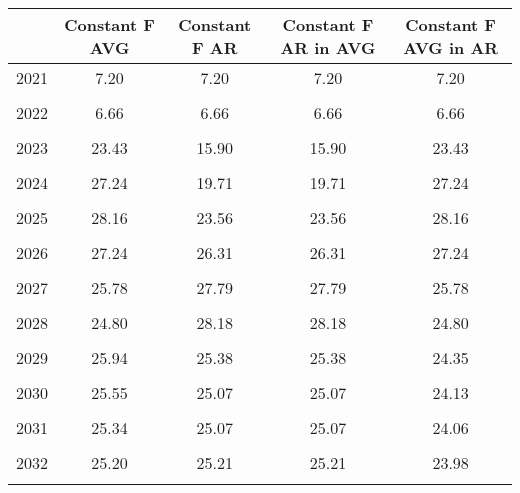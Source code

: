 \begin{tabular}{l*{4}{c}}
\hline\hline
                &Constant F AVG&Constant F AR&Constant F AR in AVG&Constant F AVG in AR\\
\hline
2021            &     7.20&     7.20&     7.20&     7.20\\
                &         &         &         &         \\
2022            &     6.66&     6.66&     6.66&     6.66\\
                &         &         &         &         \\
2023            &    23.43&    15.90&    15.90&    23.43\\
                &         &         &         &         \\
2024            &    27.24&    19.71&    19.71&    27.24\\
                &         &         &         &         \\
2025            &    28.16&    23.56&    23.56&    28.16\\
                &         &         &         &         \\
2026            &    27.24&    26.31&    26.31&    27.24\\
                &         &         &         &         \\
2027            &    25.78&    27.79&    27.79&    25.78\\
                &         &         &         &         \\
2028            &    24.80&    28.18&    28.18&    24.80\\
                &         &         &         &         \\
2029            &    25.94&    25.38&    25.38&    24.35\\
                &         &         &         &         \\
2030            &    25.55&    25.07&    25.07&    24.13\\
                &         &         &         &         \\
2031            &    25.34&    25.07&    25.07&    24.06\\
                &         &         &         &         \\
2032            &    25.20&    25.21&    25.21&    23.98\\
                &         &         &         &         \\
\hline\hline
\end{tabular}
